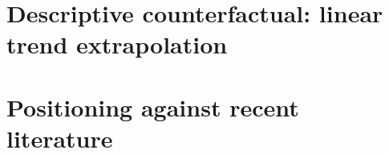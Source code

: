 \documentclass[12pt]{article}
\begin{document}
\section{Descriptive counterfactual: linear trend
extrapolation}\label{app:counterfactual}


\section{Positioning against recent literature}\label{app:positioning}




\end{document}
